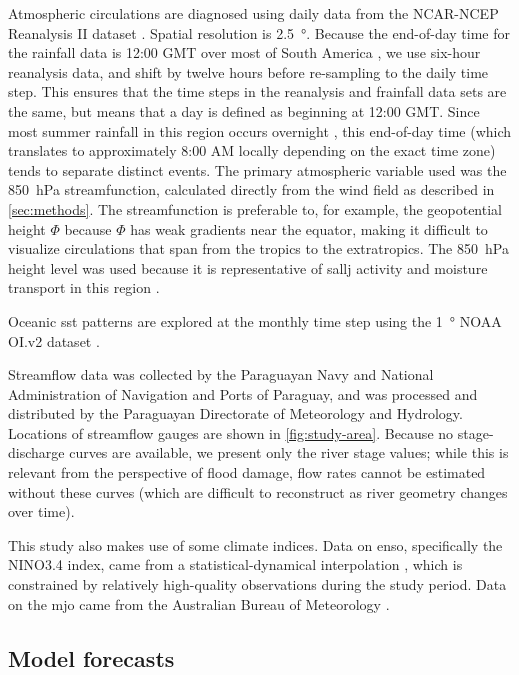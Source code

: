 \documentclass{ametsoc}
\begin{document}
Atmospheric circulations are diagnosed using daily data from the NCAR-NCEP Reanalysis II dataset \citep{Kanamitsu2002}.
Spatial resolution is \SI{2.5}{\degree}.
Because the end-of-day time for the rainfall data is 12:00 GMT over most of South America \citep{Chen2008}, we use six-hour reanalysis data, and shift by twelve hours before re-sampling to the daily time step.
This ensures that the time steps in the reanalysis and ƒrainfall data sets are the same, but means that a day is defined as beginning at 12:00 GMT.
Since most summer rainfall in this region occurs overnight \citep{Vera2006,Salio2007}, this end-of-day time (which translates to approximately 8:00 AM locally depending on the exact time zone) tends to separate distinct events.
The primary atmospheric variable  used was the \SI{850}{\hecto\pascal} streamfunction, calculated directly from the wind field as described in \cref{sec:methods}.
The streamfunction is preferable to, for example, the geopotential height $\Phi$ because $\Phi$ has weak gradients near the equator, making it difficult to visualize circulations that span from the tropics to the extratropics.
The \SI{850}{\hecto\pascal} height level was used because it is representative of \gls{sallj} activity and moisture transport in this region \citep{Marengo2004,Salio2007}.

Oceanic \gls{sst} patterns are explored at the monthly time step using the \SI{1}{\degree} NOAA OI.v2 dataset \citep{Reynolds2002}.

Streamflow data was collected by the Paraguayan Navy and National Administration of Navigation and Ports of Paraguay, and was processed and distributed by the Paraguayan Directorate of Meteorology and Hydrology.
Locations of streamflow gauges are shown in \cref{fig:study-area}.
Because no stage-discharge curves are available, we present only the river stage values; while this is relevant from the perspective of flood damage, flow rates cannot be estimated without these curves (which are difficult to reconstruct as river geometry changes over time).

This study also makes use of some climate indices.
Data on \gls{enso}, specifically the NINO3.4 index, came from a statistical-dynamical interpolation \citep{Kaplan1998}, which is constrained by relatively high-quality observations during the study period.
Data on the \gls{mjo}   came from the Australian Bureau of Meteorology \citep{Wheeler2004}.

\subsection{Model forecasts}
\end{document}
